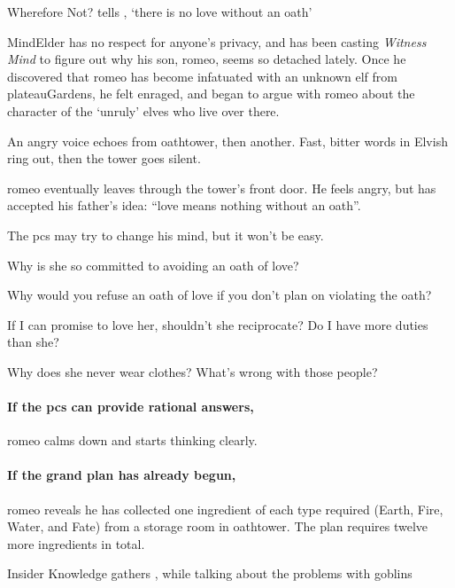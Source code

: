 \begin{multicols}{2}
{Wherefore Not?}%
{ tells , `there is no love without an oath'}%

\Gls{MindElder} has no respect for anyone's privacy, and has been \gls{casting} \textit{Witness Mind} to figure out why his son, \gls{romeo}, seems so detached lately.
Once he discovered that \gls{romeo} has become infatuated with an unknown elf from \gls{plateauGardens}, he felt enraged, and began to argue with \gls{romeo} about the character of the `unruly' elves who live over there.

\begin{boxtext}
  An angry voice echoes from \gls{oathtower}, then another.
  Fast, bitter words in Elvish ring out, then the tower goes silent.
\end{boxtext}

\Gls{romeo} eventually leaves through the tower's front door.
He feels angry, but has accepted his father's idea: ``love means nothing without an oath''.

The \glspl{pc} may try to change his mind, but it won't be easy.

\begin{speechtext}
  Why is she so committed to avoiding an oath of love?

  Why would you refuse an oath of love if you don't plan on violating the oath?

  If I can promise to love her, shouldn't she reciprocate?
  Do I have more duties than she?

  Why does she never wear clothes?
  What's wrong with those people?
\end{speechtext}

\paragraph{If the \glspl{pc} can provide rational answers,}
\gls{romeo} calms down and starts thinking clearly.

\paragraph{If the grand plan has already begun,}
\Gls{romeo} reveals he has collected one \gls{ingredient} of each type required (Earth, Fire, Water, and Fate) from a storage room in \gls{oathtower}.
The plan requires twelve more \glspl{ingredient} in total.

{Insider Knowledge}%
{ gathers , while talking about the problems with goblins}%


\end{multicols}
